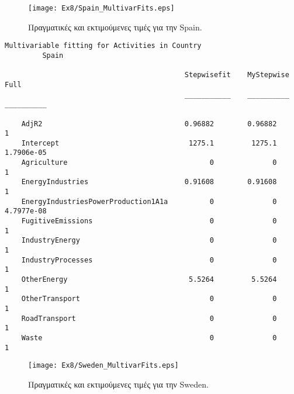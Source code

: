 \documentclass[11pt]{scrartcl} %
\begin{document}
\begin{figure}[H]

	\centering
	\texttt{[image: Ex8/Spain\_MultivarFits.eps]}	
\caption{Πραγματικές και εκτιμούμενες τιμές για την Spain.}
\label{fig:z813} 
\end{figure}



\begin{Verbatim}[fontsize=\small]
Multivariable fitting for Activities in Country
 	 	 Spain

                                           Stepwisefit    MyStepwise       Full   
                                           ___________    __________    __________

    AdjR2                                  0.96882        0.96882                1
    Intercept                               1275.1         1275.1       1.7906e-05
    Agriculture                                  0              0                1
    EnergyIndustries                       0.91608        0.91608                1
    EnergyIndustriesPowerProduction1A1a          0              0       4.7977e-08
    FugitiveEmissions                            0              0                1
    IndustryEnergy                               0              0                1
    IndustryProcesses                            0              0                1
    OtherEnergy                             5.5264         5.5264                1
    OtherTransport                               0              0                1
    RoadTransport                                0              0                1
    Waste                                        0              0                1
\end{Verbatim}



\begin{figure}[H]

	\centering
	\texttt{[image: Ex8/Sweden\_MultivarFits.eps]}	
\caption{Πραγματικές και εκτιμούμενες τιμές για την Sweden.}
\label{fig:z814} 
\end{figure}
\end{document}

